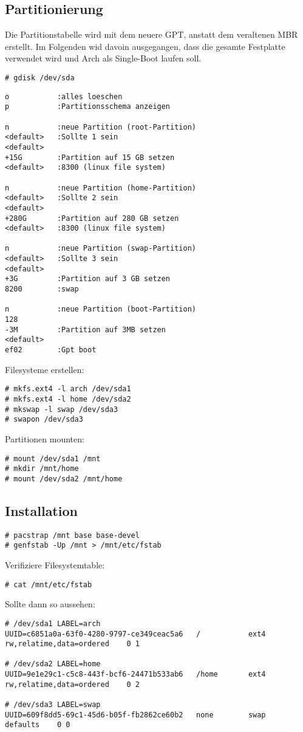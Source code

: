 \subsection{Partitionierung}
\label{subsec:partitioning}
Die Partitionstabelle wird mit dem neuere GPT, anstatt dem veraltenen MBR erstellt.
Im Folgenden wid davoin ausgegangen, dass die gesamte Festplatte verwendet wird
und Arch als Single-Boot laufen soll.
\begin{lstlisting}[style=Bash]
# gdisk /dev/sda
\end{lstlisting}
\begin{lstlisting}[style=gdisk]
o           :alles loeschen
p           :Partitionsschema anzeigen

n           :neue Partition (root-Partition)
<default>   :Sollte 1 sein
<default>     
+15G        :Partition auf 15 GB setzen
<default>   :8300 (linux file system)

n           :neue Partition (home-Partition)
<default>   :Sollte 2 sein
<default>     
+280G       :Partition auf 280 GB setzen
<default>   :8300 (linux file system)

n           :neue Partition (swap-Partition)
<default>   :Sollte 3 sein
<default>     
+3G         :Partition auf 3 GB setzen
8200        :swap

n           :neue Partition (boot-Partition)
128         
-3M         :Partition auf 3MB setzen
<default>   
ef02        :Gpt boot
\end{lstlisting}
Filesysteme erstellen:
\begin{lstlisting}[style=Bash]
# mkfs.ext4 -l arch /dev/sda1
# mkfs.ext4 -l home /dev/sda2
# mkswap -l swap /dev/sda3
# swapon /dev/sda3
\end{lstlisting}
Partitionen mounten:
\begin{lstlisting}[style=Bash]
# mount /dev/sda1 /mnt 
# mkdir /mnt/home 
# mount /dev/sda2 /mnt/home
\end{lstlisting}

\subsection{Installation}
\label{subsec:installation}
\begin{lstlisting}[style=Bash]
# pacstrap /mnt base base-devel 
# genfstab -Up /mnt > /mnt/etc/fstab 
\end{lstlisting}
Verifiziere Filesystemtable:
\begin{lstlisting}[style=Bash]
# cat /mnt/etc/fstab
\end{lstlisting}
Sollte dann so aussehen:
\begin{lstlisting}[style=Bash]
# /dev/sda1 LABEL=arch
UUID=c6851a0a-63f0-4280-9797-ce349ceac5a6   /           ext4        rw,relatime,data=ordered    0 1

# /dev/sda2 LABEL=home
UUID=9e1e29c1-c5c8-443f-bcf6-24471b533ab6   /home       ext4        rw,relatime,data=ordered    0 2

# /dev/sda3 LABEL=swap
UUID=609f8dd5-69c1-45d6-b05f-fb2862ce60b2   none        swap        defaults    0 0
\end{lstlisting}

